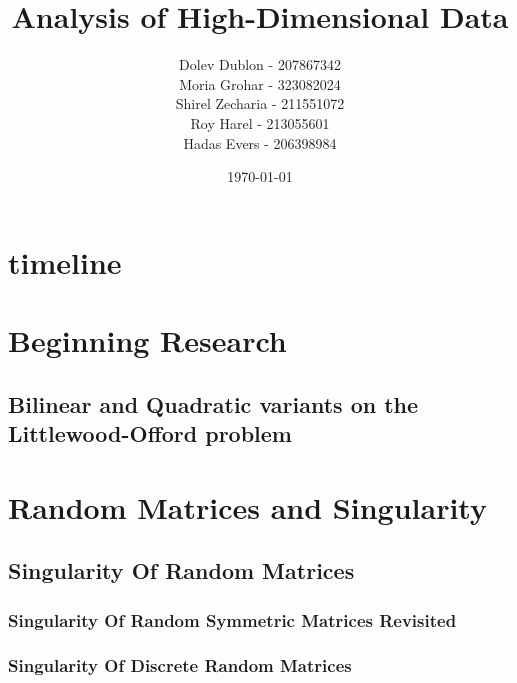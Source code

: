 \documentclass[12pt]{article}
\title{\textbf{Analysis of High-Dimensional Data}}
\author{
    Dolev Dublon - 207867342\\
    Moria Grohar - 323082024\\ 
    Shirel Zecharia - 211551072\\
    Roy Harel - 213055601\\
    Hadas Evers - 206398984 
}
\date{\today}
\begin{document}
\maketitle


\tableofcontents

\newpage





\section{timeline}



\section{Beginning Research}
\subsection{Bilinear and Quadratic variants on the Littlewood-Offord problem}



\section{Random Matrices and Singularity}



\subsection{Singularity Of Random Matrices}
\subsubsection{Singularity Of Random Symmetric Matrices Revisited}



\subsubsection{Singularity Of Discrete Random Matrices}

\\\newline

\end{document}

